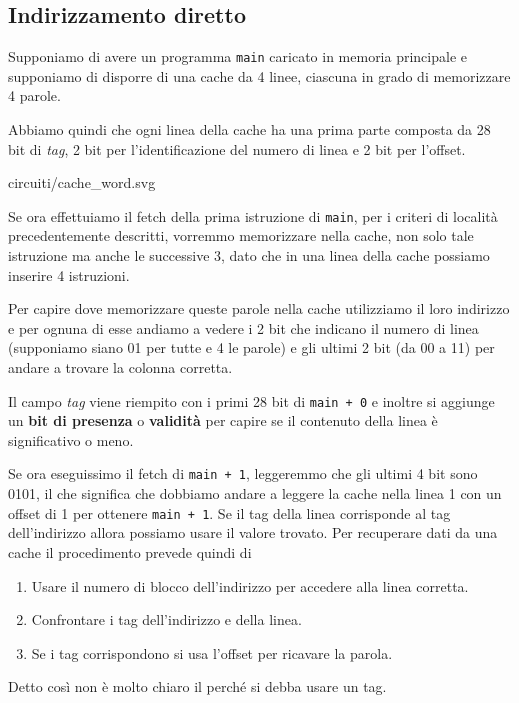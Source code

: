\subsection{Indirizzamento diretto}
Supponiamo di avere un programma \verb|main| caricato in memoria principale e supponiamo di
disporre di una cache da 4 linee, ciascuna in grado di memorizzare 4 parole.

Abbiamo quindi che ogni linea della cache ha una prima parte composta da 28 bit di \emph{tag}, 2
bit per l'identificazione del numero di linea e 2 bit per l'offset.
\begin{center}
	 {circuiti/cache_word.svg}
\end{center}

Se ora effettuiamo il fetch della prima istruzione di \verb|main|, per i criteri di località
precedentemente descritti, vorremmo memorizzare nella cache, non solo tale istruzione ma anche le
successive 3, dato che in una linea della cache possiamo inserire 4 istruzioni.

Per capire dove memorizzare queste parole nella cache utilizziamo il loro indirizzo e per ognuna di
esse andiamo a vedere i 2 bit che indicano il numero di linea (supponiamo siano 01 per tutte e 4
le parole) e gli ultimi 2 bit (da 00 a 11) per andare a trovare la colonna corretta.
\begin{center}
	
\end{center}
Il campo \emph{tag} viene riempito con i primi 28 bit di \verb|main + 0| e inoltre si aggiunge un
\textbf{bit di presenza} o \textbf{validità} per capire se il contenuto della linea è significativo
o meno.

Se ora eseguissimo il fetch di \verb|main + 1|, leggeremmo che gli ultimi 4 bit sono 0101, il che
significa che dobbiamo andare a leggere la cache nella linea 1 con un offset di 1 per ottenere
\verb|main + 1|. Se il tag della linea corrisponde al tag dell'indirizzo allora possiamo usare il
valore trovato. Per recuperare dati da una cache il procedimento prevede quindi di
\begin{enumerate}
	\item Usare il numero di blocco dell'indirizzo per accedere alla linea corretta.
	\item Confrontare i tag dell'indirizzo e della linea.
	\item Se i tag corrispondono si usa l'offset per ricavare la parola.
\end{enumerate}
Detto così non è molto chiaro il perché si debba usare un tag.
